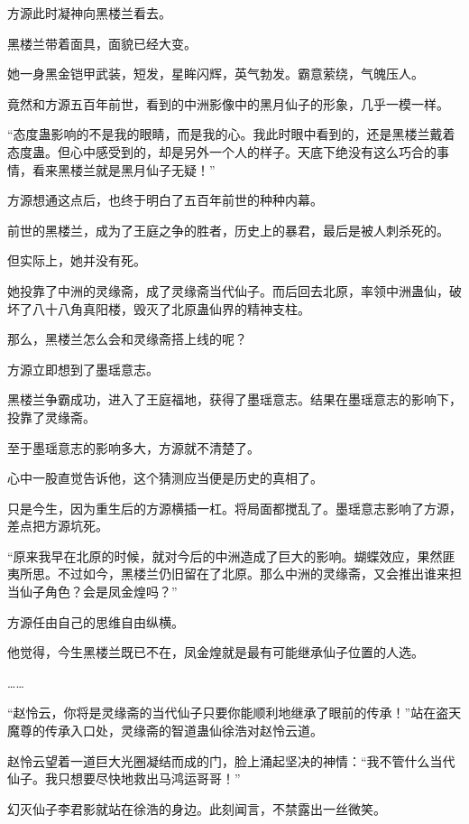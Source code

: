 
\begin{this_body}

方源此时凝神向黑楼兰看去。

黑楼兰带着面具，面貌已经大变。

她一身黑金铠甲武装，短发，星眸闪辉，英气勃发。霸意萦绕，气魄压人。

竟然和方源五百年前世，看到的中洲影像中的黑月仙子的形象，几乎一模一样。

“态度蛊影响的不是我的眼睛，而是我的心。我此时眼中看到的，还是黑楼兰戴着态度蛊。但心中感受到的，却是另外一个人的样子。天底下绝没有这么巧合的事情，看来黑楼兰就是黑月仙子无疑！”

方源想通这点后，也终于明白了五百年前世的种种内幕。

前世的黑楼兰，成为了王庭之争的胜者，历史上的暴君，最后是被人刺杀死的。

但实际上，她并没有死。

她投靠了中洲的灵缘斋，成了灵缘斋当代仙子。而后回去北原，率领中洲蛊仙，破坏了八十八角真阳楼，毁灭了北原蛊仙界的精神支柱。

那么，黑楼兰怎么会和灵缘斋搭上线的呢？

方源立即想到了墨瑶意志。

黑楼兰争霸成功，进入了王庭福地，获得了墨瑶意志。结果在墨瑶意志的影响下，投靠了灵缘斋。

至于墨瑶意志的影响多大，方源就不清楚了。

心中一股直觉告诉他，这个猜测应当便是历史的真相了。

只是今生，因为重生后的方源横插一杠。将局面都搅乱了。墨瑶意志影响了方源，差点把方源坑死。

“原来我早在北原的时候，就对今后的中洲造成了巨大的影响。蝴蝶效应，果然匪夷所思。不过如今，黑楼兰仍旧留在了北原。那么中洲的灵缘斋，又会推出谁来担当仙子角色？会是凤金煌吗？”

方源任由自己的思维自由纵横。

他觉得，今生黑楼兰既已不在，凤金煌就是最有可能继承仙子位置的人选。

……

“赵怜云，你将是灵缘斋的当代仙子只要你能顺利地继承了眼前的传承！”站在盗天魔尊的传承入口处，灵缘斋的智道蛊仙徐浩对赵怜云道。

赵怜云望着一道巨大光圈凝结而成的门，脸上涌起坚决的神情：“我不管什么当代仙子。我只想要尽快地救出马鸿运哥哥！”

幻灭仙子李君影就站在徐浩的身边。此刻闻言，不禁露出一丝微笑。


\end{this_body}
